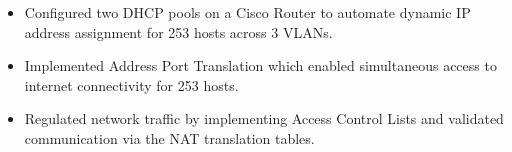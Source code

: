 \projectItem[
        title={Cisco Router Configuration and Technical Hardening},
        duration={},
        keyHighlight={Queensborough Community College},
        location={Completed: May 2025}
    ]
    \begin{itemize}
        \vspace{-0.5em}
        \itemsep -6pt {}
        \item Configured two DHCP pools on a Cisco Router to automate dynamic IP address assignment for 253 hosts across 3 VLANs.
        \item Implemented Address Port Translation which enabled simultaneous access to internet connectivity for 253 hosts.
        \item Regulated network traffic  by implementing Access Control Lists and validated communication via the NAT translation tables.

    \end{itemize}